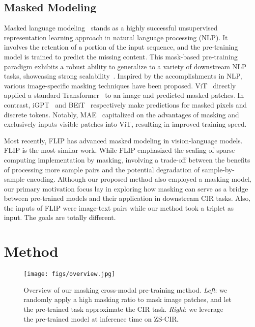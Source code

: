 \documentclass[10pt,twocolumn,letterpaper]{article}
\begin{document}
\subsection{Masked Modeling}
Masked language modeling~\cite{kenton2019bert, brown2020language} stands as a highly successful unsupervised representation learning approach in natural language processing (NLP). It involves the retention of a portion of the input sequence, and the pre-training model is trained to predict the missing content. This mask-based pre-training paradigm exhibits a robust ability to generalize to a variety of downstream NLP tasks, showcasing strong scalability~\cite{brown2020language}.
Inspired by the accomplishments in NLP, various image-specific masking techniques have been proposed. ViT~\cite{dosovitskiy2020vit} directly applied a standard Transformer~\cite{vaswani2017attention} to an image and predicted masked patches. In contrast, iGPT~\cite{chen2020generative} and BEiT~\cite{bao2021beit} respectively make predictions for masked pixels and discrete tokens. Notably, MAE~\cite{he2022masked} capitalized on the advantages of masking and exclusively inputs visible patches into ViT, resulting in improved training speed. 

Most recently, FLIP \cite{li2023scaling} has advanced masked modeling in vision-language models. FLIP is the most similar work. While FLIP \cite{li2023scaling}  emphasized the scaling of sparse computing implementation by masking, involving a trade-off between the benefits of processing more sample pairs and the potential degradation of sample-by-sample encoding. Although our proposed method also employed a masking model, our primary motivation focus lay in exploring how masking can serve as a bridge between pre-trained models and their application in downstream CIR tasks. Also, the inputs of FLIP were image-text pairs while our method took a triplet as input. The goals are totally different.


\section{Method}
\begin{figure*}[t]
    \centering
    \texttt{[image: figs/overview.jpg]}
    \caption{Overview of our masking cross-modal pre-training method. \textit{Left}: we randomly apply a high masking ratio to mask image patches, and let the pre-trained task approximate the CIR task. \textit{Right}: we leverage the pre-trained model  at inference time on ZS-CIR.}
    \label{fig:overview}
\end{figure*}
\end{document}
